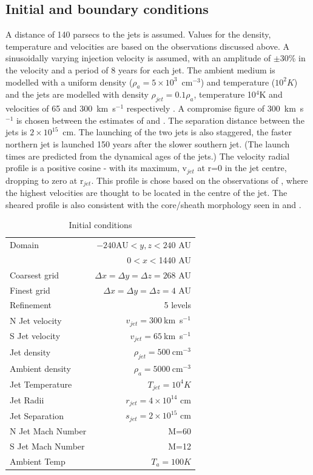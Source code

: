 \subsection{Initial and boundary conditions}
A distance of 140 parsecs to the jets is assumed. 
Values for the density, temperature and velocities are based on the observations discussed above.
A sinusoidally varying injection velocity
\citep{1990ApJ...364..601R} is assumed, with an amplitude of
$\pm$30\% in the velocity and a period of 8 years for each jet. 
The ambient medium is modelled
with a uniform density ($\rho_a=5 \times 10^{3}$~cm$^{-3}$) and temperature
($10^2 K$) and the jets are modelled with density $\rho_{jet}=0.1\rho_a$,
temperature 10$^4$K and velocities of 65 and 300~km~s$^{-1}$ respectively
\citep{2005ApJ...L}. A compromise figure of 300~km~s$^{-1}$ is chosen between the
estimates of \citet{2005ApJ...L} and \citet{2000AJ....119.1872H}. 
The separation distance between the jets is $2 \times 10^{15}$~cm.
The launching of the two jets is also staggered, the faster northern jet is launched 150 years after the slower southern jet. (The launch times are predicted from the dynamical ages of the jets.)
The velocity radial profile is a positive cosine - with its maximum, v$_{jet}$ at r=0 in the jet centre, dropping to zero at r$_{jet}$. This profile is chose based on the observations of  \citet{2000ApJ...537L..49B}, where the highest velocities are thought to be located in the centre of the jet.
The sheared profile is also consistent with the core/sheath morphology seen in \citet{2002ApJ...576..204H} and \citet{2000ApJ...540..342F}.


\begin{table}
\begin{center}
\begin{tabular}{l r}
Domain & $-240 $AU$<y,z<240$ AU \\
 & 0$<x<$1440 AU \\
Coarsest grid & $\Delta x=\Delta y=\Delta z=268$ AU \\
Finest grid & $\Delta x=\Delta y=\Delta z=4$ AU \\
Refinement & 5 levels \\
N Jet velocity & $v_{jet}=300~$km~s$^{-1}$ \\
S Jet velocity & $v_{jet}=65~$km~s$^{-1}$ \\
Jet density & $\rho_{jet}=500~$cm$^{-3}$ \\
Ambient density & $\rho_a=5000~$cm$^{-3}$ \\
Jet Temperature & $T_{jet}=10^4 K$ \\
Jet Radii & $r_{jet}=4\times10^{14} $ cm \\
Jet Separation & $s_{jet}=2\times10^{15} $ cm \\
N Jet Mach Number & M=60 \\
S Jet Mach Number & M=12 \\
Ambient Temp & $T_a=100 K$ \\
\end{tabular}
\caption{Initial conditions}
\end{center}
\end{table}

